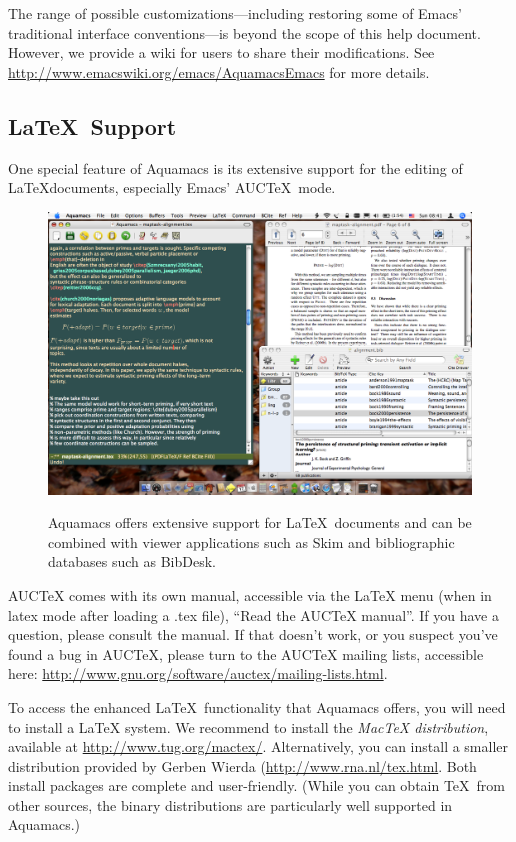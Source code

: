 \documentclass[11pt,letterpaper]{article}
\begin{document}
The range of possible customizations---including restoring some of Emacs' traditional interface conventions---is beyond the scope of this help document. However, we provide a wiki for users to share their modifications. See \url{http://www.emacswiki.org/emacs/AquamacsEmacs} for more details.

\subsection{\LaTeX\ Support}

One special feature of Aquamacs is its extensive support for the editing of \LaTeX documents, especially Emacs' AUC\TeX\ mode.

\begin{figure}
\centering
{\includegraphics[width=5in]{aquamacs-tex}}
\caption{Aquamacs offers extensive support for \LaTeX\ documents and
  can be combined with viewer applications such as Skim and
  bibliographic databases such as BibDesk.}
\label{aquamacs-tex}
\end{figure}

AUCTeX comes with its own manual, accessible via the LaTeX menu (when in latex mode after loading a .tex file), ``Read the AUCTeX manual''. If you have a question, please consult the manual. If that doesn't work, or you suspect you've found a bug in AUCTeX, please turn to the AUCTeX mailing lists, accessible here: \url{http://www.gnu.org/software/auctex/mailing-lists.html}.

To access the enhanced \LaTeX\ functionality that Aquamacs offers, you will need to install a LaTeX system. We recommend to install the \emph{MacTeX distribution}, available at \url{http://www.tug.org/mactex/}. Alternatively, you can install a smaller distribution provided by Gerben Wierda (\url{http://www.rna.nl/tex.html}. Both install packages are complete and user-friendly. (While you can obtain \TeX\ from other sources, the binary distributions are particularly well supported in Aquamacs.)
\end{document}
